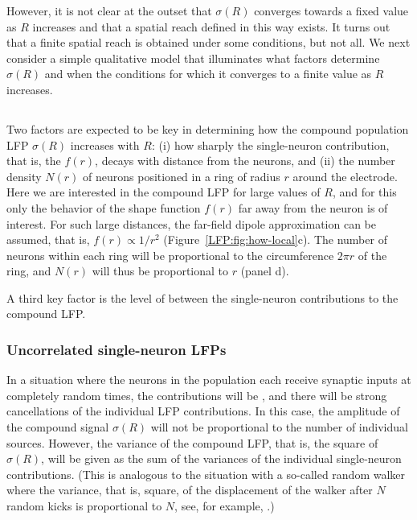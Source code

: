 However, it is not clear at the outset that $\sigma(R)$ converges towards a fixed value as $R$ increases and that
a spatial reach defined in this way exists. It turns out that a finite spatial reach is obtained under some conditions, but not all.
We next consider a simple qualitative model that illuminates what factors determine $\sigma(R)$ and when the conditions for
which it converges to a finite value as $R$ increases. 

\subsection{}
Two factors are expected to be key in determining how the compound population LFP $\sigma(R)$ increases with $R$:
(i) how sharply the single-neuron contribution, that is, the  $f(r)$, decays with distance from the neurons, and (ii) the number
density $N(r)$ of neurons positioned in a ring of radius $r$ around the electrode. Here we are interested in the compound LFP for large values of
$R$, and for this only the behavior of the shape function $f(r)$ far away from the neuron is of interest. For such large distances, the far-field dipole approximation
can be assumed, that is, $f(r) \propto 1/r^2$ (Figure~\ref{LFP:fig:how-local}c). 
The number of neurons within each ring will be proportional to the circumference $2\pi r$
of the ring, and $N(r)$ will thus be proportional to $r$ (panel d).

A third key factor is the level of  between the single-neuron contributions to the compound LFP. 

\subsubsection{Uncorrelated single-neuron LFPs}
In a situation
where the neurons in the population each receive synaptic inputs at completely random times, the contributions will be , and
there will be strong cancellations of the individual LFP contributions. In this case, the amplitude of the compound signal  $\sigma(R)$ will not be proportional 
to the number of individual sources. However, the variance of the compound LFP, that is, the square of  $\sigma(R)$, will be
given as the sum of the variances of the individual single-neuron contributions. 
(This is analogous to the situation with a so-called random walker where
the variance, that is, square, of the displacement of the walker after $N$ random kicks is proportional to $N$, see, for example, .)

